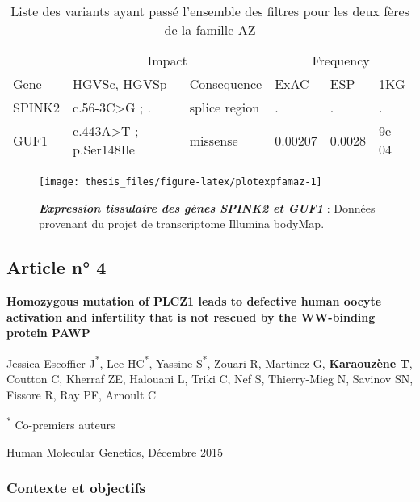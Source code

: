 \documentclass[12pt,twoside]{ugathesis}
\begin{document}
\begin{longtable}[t]{llllll}
\caption{\label{tab:tabrecapaz}Liste des variants ayant passé l'ensemble des filtres pour les deux fères de la famille AZ}\\
\toprule
\multicolumn{1}{c}{ } & \multicolumn{2}{c}{Impact} & \multicolumn{3}{c}{Frequency} \\
\cmidrule(l{2pt}r{2pt}){2-3} \cmidrule(l{2pt}r{2pt}){4-6}
Gene & HGVSc, HGVSp & Consequence & ExAC & ESP & 1KG\\
\midrule
SPINK2 & c.56-3C>G ; . & splice region & . & . & .\\
GUF1 & c.443A>T ; p.Ser148Ile & missense & 0.00207 & 0.0028 & 9e-04\\
\bottomrule
\end{longtable}

\newpage

\begin{figure}

{\centering \texttt{[image: thesis\_files/figure-latex/plotexpfamaz-1]} 

}

\caption[Expression tissulaire des gènes SPINK2 et GUF1]{\textbf{\emph{Expression tissulaire des gènes
\emph{SPINK2} et \emph{GUF1}}} : Données provenant du projet de
transcriptome Illumina bodyMap.}\label{fig:plotexpfamaz}
\end{figure}





\newpage

\subsection{Article n° 4}\label{article-n-4}

\textbf{Homozygous mutation of PLCZ1 leads to defective human oocyte
activation and infertility that is not rescued by the WW-binding protein
PAWP}

Jessica Escoffier J\textsuperscript{*}, Lee HC\textsuperscript{*},
Yassine S\textsuperscript{*}, Zouari R, Martinez G, \textbf{Karaouzène
T}, Coutton C, Kherraf ZE, Halouani L, Triki C, Nef S, Thierry-Mieg N,
Savinov SN, Fissore R, Ray PF, Arnoult C

\textsuperscript{*} Co-premiers auteurs

Human Molecular Genetics, Décembre 2015

\newpage

\subsubsection{Contexte et objectifs}\label{contexte-et-objectifs-1}
\end{document}
